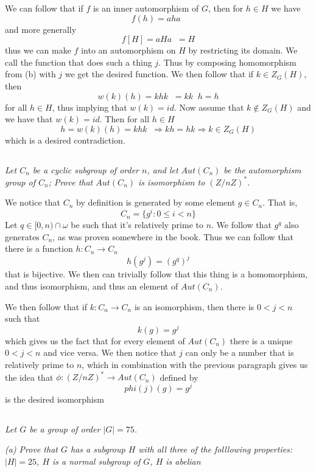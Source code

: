 \documentclass[11pt,oneside,titlepage]{book}
\DeclareMathOperator \inv {^{-1}}
\DeclareMathOperator \ra {\Rightarrow}
\newcommand{\set}[1]{\{ #1 \}}
\begin{document}
We can follow that if $f$ is an inner automorphism of $G$, then for $h
\in H$ we have
$$f(h) = a h a\inv$$
and more generally
$$f[H] = a H a\inv = H$$
thus we can make $f$ into an automorphism on $H$ by restricting its
domain. We call the function that does such a thing $j$.  Thus by
composing homomorphism from (b) with $j$ we get the desired function.
We then follow that if $k \in Z_G(H)$, then
$$w(k)(h) = k h k\inv = k k\inv h = h$$
for all $h \in H$, thus implying that $w(k) = id$. Now assume that
$k\notin Z_G(H)$ and we have that $w(k) = id$. Then for all $h \in H$
$$h = w(k)(h) = k h k\inv  \ra kh = hk \ra k \in Z_G(H)$$
which is a desired contradiction.

\subsection{}

\textit{Let $C_n$ be a cyclic subgroup of order $n$, and let
  $Aut(C_n)$ be the automorphism group of $C_n$; Prove that
  $Aut(C_n)$ is isomorphism to $(Z/nZ)^*$.}

We notice that $C_n$ by definition is generated by some element
$g \in C_n$. That is,
$$C_n = \set{g^i: 0 \leq i < n}$$
Let $q \in [0, n) \cap \omega$ be such that it's relatively prime to
$n$.  We follow that $g^q$ also generates $C_n$, as was proven
somewhere in the book. Thus we can follow that there is a function $h:
C_n \to C_n$
$$h(g^j) = (g^q)^j$$
that is bijective. We then can trivially follow that this thing is a
homomorphism, and thus isomorphism, and thus an element of $Aut(C_n)$.

We then follow that if $k: C_n \to C_n$ is an isomorphism, then there is
$0 < j < n$ such that
$$k(g) = g^j$$
which gives us the fact that for every element of $Aut(C_n)$ there is
a unique $0 < j < n$ and vice versa. We then notice that $j$ can only
be a number that is relatively prime to $n$, which in combination with
the previous paragraph gives us the idea that $\phi: (Z/nZ)^* \to Aut(C_n)$
defined by
$$phi(j)(g) = g^j$$
is the desired isomorphism


\subsection{}

\textit{Let $G$ be a group of order $|G| = 75$.}

\textit{(a) Prove that $G$ has a subgroup $H$ with all three of the
  folllowing properties: $|H| = 25$, $H$ is a normal subgroup of $G$,
  $H$ is abelian}
\end{document}
